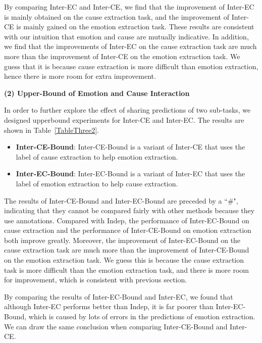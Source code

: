 \documentclass[11pt,a4paper]{article}
\begin{document}
By comparing Inter-EC and Inter-CE, we find that the improvement of Inter-EC is mainly obtained on the cause extraction task, and the improvement of Inter-CE is mainly gained on the emotion extraction task. These results are consistent with our intuition that emotion and cause are mutually indicative. In addition, we find that the improvements of Inter-EC on the cause extraction task are much more than the improvement of Inter-CE on the emotion extraction task. We guess that it is because cause extraction is more difficult than emotion extraction, hence there is more room for extra improvement.

\vspace{2mm}

\noindent \textbf{(2) Upper-Bound of Emotion and Cause Interaction}


In order to further explore the effect of sharing predictions of two sub-tasks, we designed upperbound experiments for Inter-CE and Inter-EC. The results are shown in Table~\ref{TableThree2}.

\begin{itemize}
	\item \textbf{Inter-CE-Bound}: Inter-CE-Bound is a variant of Inter-CE that uses the label of cause extraction to help emotion extraction.
	\item \textbf{Inter-EC-Bound}: Inter-EC-Bound is a variant of Inter-EC that uses the label of emotion extraction to help cause extraction. 	
\end{itemize}

The results of Inter-CE-Bound and Inter-EC-Bound are preceded by a ``\#", indicating that they cannot be compared fairly with other methods because they use annotations. Compared with Indep, the performance of Inter-EC-Bound on cause extraction and the performance of Inter-CE-Bound on emotion extraction both improve greatly. Moreover, the improvement of Inter-EC-Bound on the cause extraction task are much more than the improvement of Inter-CE-Bound on the emotion extraction task. We guess this is because the cause extraction task is more difficult than the emotion extraction task, and there is more room for improvement, which is consistent with previous section.

By comparing the results of Inter-EC-Bound and Inter-EC, we found that although Inter-EC performs better than Indep, it is far poorer than Inter-EC-Bound, which is caused by lots of errors in the predictions of emotion extraction. We can draw the same conclusion when comparing Inter-CE-Bound and Inter-CE.
\end{document}
